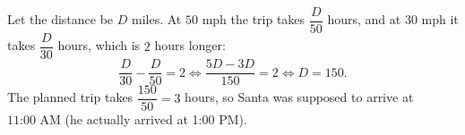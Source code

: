 Let the distance be $D$ miles. At $50$ mph the trip takes $\dfrac{D}{50}$ hours, and at $30$ mph it takes $\dfrac{D}{30}$ hours, which is $2$ hours longer:
\[
\dfrac{D}{30}-\dfrac{D}{50}=2\iff \dfrac{5D-3D}{150}=2\iff D=150 .
\]
The planned trip takes $\dfrac{150}{50}=3$ hours, so Santa was supposed to arrive at $\boxed{\text{11:00 AM}}$ (he actually arrived at 1:00 PM).
